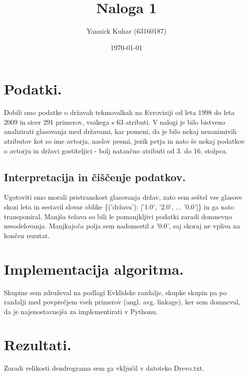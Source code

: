 \documentclass[11pt]{article}
\title{Naloga 1}
\author{Yannick Kuhar (63160187)}
\date{\today}
\begin{document}
\maketitle


\section{Podatki.}
Dobili smo podatke o državah tekmovalkah na Evroviziji od leta 1998 do leta 2009 in sicer 291 primerov, vsakega s 63 atributi. V nalogi je bilo bistveno analizirati glasovanja med državami, kar pomeni, da je bilo nekaj nezanimivih atributov kot so ime avtorja, naslov pesmi, jezik petja in nato še nekaj podatkov o avtorju in državi gostiteljici - bolj natančno atributi od 3. do 16. stolpca.

\subsection{Interpretacija in čiščenje podatkov.}
Ugotoviti smo morali pristranskost glasovanja držav, zato sem seštel vse glasove skozi leta in sestavil slovar oblike \{('država'): ['1.0', '2.0', ... '0.0']\} in ga nato transponiral. Manjša težava so bili le pomanjkljivi podatki zaradi domnevno nesodelovanja. Manjkajoča polja sem nadomestil z '0.0', saj skoraj ne vpliva na končen rezutat.

\section{Implementacija algoritma.}
Skupine sem združeval na podlagi Evklidske razdalje, skupke skupin pa po razdalji med povprečjem vseh primerov (angl. avg. linkage), ker sem domneval, da je najenostavnejša za implementirati v Pythonu.

\section{Rezultati.}

Zaradi velikosti dendrograma sem ga vključil v datoteko Drevo.txt.
\end{document}
